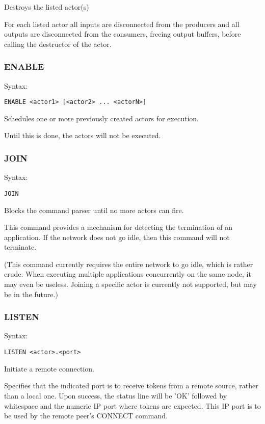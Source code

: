 \documentclass[10pt, a4paper]{article}
\begin{document}
Destroys the listed actor(s)

For each listed actor all inputs are disconnected from the producers and all outputs are disconnected from the consumers, freeing output buffers, before calling the destructor of the actor.

\subsubsection*{ENABLE}

Syntax:
\begin{verbatim}
ENABLE <actor1> [<actor2> ... <actorN>]
\end{verbatim}

Schedules one or more previously created actors for execution.

Until this is done, the actors will not be executed.

\subsubsection*{JOIN}

Syntax:
\begin{verbatim}
JOIN
\end{verbatim}

Blocks the command parser until no more actors can fire.

This command provides a mechanism for detecting the termination of an application. If the network does not go idle, then this command will not terminate.

(This command currently requires the entire network to go idle, which is rather crude. When executing multiple applications concurrently on the same node, it may even be useless. Joining a specific actor is currently not supported, but may be in the future.)

\subsubsection*{LISTEN}

Syntax:
\begin{verbatim}
LISTEN <actor>.<port>
\end{verbatim}

Initiate a remote connection.

Specifies that the indicated port is to receive tokens from a remote source, rather than a local one. Upon success, the status line will be 'OK' followed by whitespace and the numeric IP port where tokens are expected. This IP port is to be used by the remote peer's CONNECT command.
\end{document}
